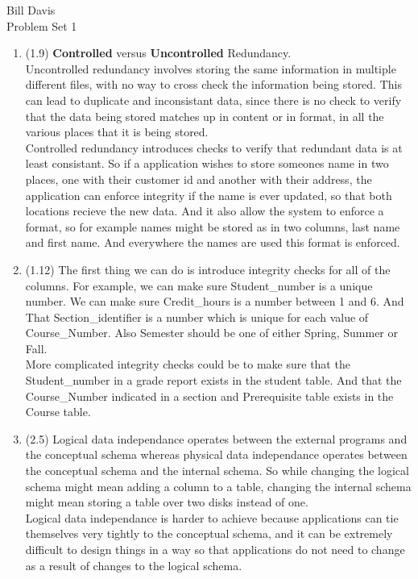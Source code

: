 \documentclass[11pt,fleqn]{article}
\begin{document}
\noindent Bill Davis \\
 Problem Set 1

\begin{enumerate}
\item (1.9) %
 {\bf Controlled} versus {\bf Uncontrolled} Redundancy. \\
Uncontrolled redundancy involves storing the same information in multiple different files, with no way to cross check the information being stored. This can lead to duplicate and inconsistant data, since there is no check to verify that the data being stored matches up in content or in format, in all the various places that it is being stored. \\

Controlled redundancy introduces checks to verify that redundant data is at least consistant. So if a application wishes to store someones name in two places, one with their customer id and another with their address, the application can enforce integrity if the name is ever updated, so that both locations recieve the new data. And it also allow the system to enforce a format, so for example names might be stored as in two columns, last name and first name. And everywhere the names are used this format is enforced. 

\item (1.12) %
The first thing we can do is introduce integrity checks for all of the columns. For example, we can make sure Student\_number is a unique number. We can make sure Credit\_hours is a number between 1 and 6. And That Section\_identifier is a number which is unique for each value of Course\_Number. Also Semester should be one of either Spring, Summer or Fall. \\
More complicated integrity checks could be to make sure that the Student\_number in a grade report exists in the student table. And that the Course\_Number indicated in a section and Prerequisite table exists in the Course table. 

\item (2.5) %
Logical data independance operates between the external programs and the conceptual schema whereas physical data independance operates between the conceptual schema and the internal schema. So while changing the logical schema might mean adding a column to a table, changing the internal schema might mean storing a table over two disks instead of one. \\
Logical data independance is harder to achieve because applications can tie themselves very tightly to the conceptual schema, and it can be extremely difficult to design things in a way so that applications do not need to change as a result of changes to the logical schema.  


\end{enumerate}
\end{document}
